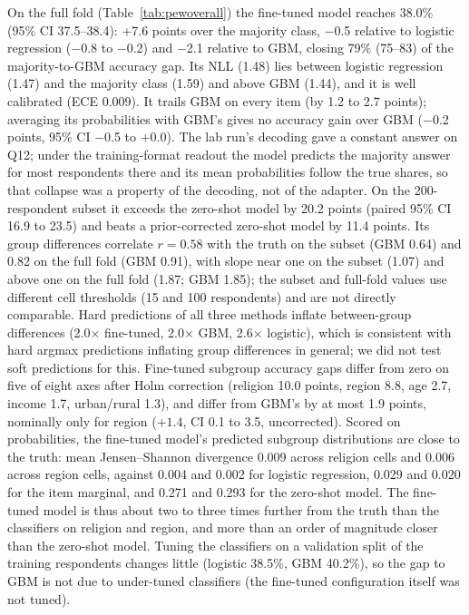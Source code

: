 \documentclass[conference]{IEEEtran}
\begin{document}
\begin{table}[!t]
\caption{Pew fold-0 results, 46{,}209 held-out answers from 6{,}000 respondents. $^\dagger$MAE on ordinal items. $^\S$Error of the predicted subgroup-mean answer on a $[0,1]$ scale (hard predictions).}
\label{tab:pewoverall}
\centering
\footnotesize

\end{table}

On the full fold (Table~\ref{tab:pewoverall}) the fine-tuned model reaches 38.0\% (95\% CI 37.5--38.4): +7.6 points over the majority class, $-$0.5 relative to logistic regression ($-$0.8 to $-$0.2) and $-$2.1 relative to GBM, closing 79\% (75--83) of the majority-to-GBM accuracy gap. Its NLL (1.48) lies between logistic regression (1.47) and the majority class (1.59) and above GBM (1.44), and it is well calibrated (ECE 0.009). It trails GBM on every item (by 1.2 to 2.7 points); averaging its probabilities with GBM's gives no accuracy gain over GBM ($-$0.2 points, 95\% CI $-$0.5 to $+$0.0). The lab run's decoding gave a constant answer on Q12; under the training-format readout the model predicts the majority answer for most respondents there and its mean probabilities follow the true shares, so that collapse was a property of the decoding, not of the adapter. On the 200-respondent subset it exceeds the zero-shot model by 20.2 points (paired 95\% CI 16.9 to 23.5) and beats a prior-corrected zero-shot model by 11.4 points. Its group differences correlate $r={0.58}$ with the truth on the subset (GBM 0.64) and 0.82 on the full fold (GBM 0.91), with slope near one on the subset (1.07) and above one on the full fold (1.87; GBM 1.85); the subset and full-fold values use different cell thresholds (15 and 100 respondents) and are not directly comparable. Hard predictions of all three methods inflate between-group differences (2.0$\times$ fine-tuned, 2.0$\times$ GBM, 2.6$\times$ logistic), which is consistent with hard argmax predictions inflating group differences in general; we did not test soft predictions for this. Fine-tuned subgroup accuracy gaps differ from zero on five of eight axes after Holm correction (religion 10.0 points, region 8.8, age 2.7, income 1.7, urban/rural 1.3), and differ from GBM's by at most 1.9 points, nominally only for region ($+1.4$, CI 0.1 to 3.5, uncorrected). Scored on probabilities, the fine-tuned model's predicted subgroup distributions are close to the truth: mean Jensen--Shannon divergence 0.009 across religion cells and 0.006 across region cells, against 0.004 and 0.002 for logistic regression, 0.029 and 0.020 for the item marginal, and 0.271 and 0.293 for the zero-shot model. The fine-tuned model is thus about two to three times further from the truth than the classifiers on religion and region, and more than an order of magnitude closer than the zero-shot model. Tuning the classifiers on a validation split of the training respondents changes little (logistic 38.5\%, GBM 40.2\%), so the gap to GBM is not due to under-tuned classifiers (the fine-tuned configuration itself was not tuned).
\end{document}
